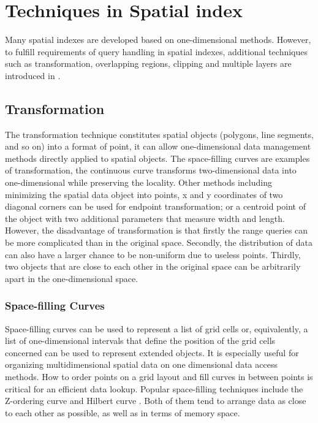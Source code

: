 \section{Techniques in Spatial index}
Many spatial indexes are developed based on one-dimensional methods. However, to fulfill requirements of query handling in spatial indexes, additional techniques such as transformation, overlapping regions, clipping and multiple layers are introduced in \cite{Faloutsos:1991ue}. 


\subsection{Transformation} \label{Transformation}
The transformation technique constitutes spatial objects (polygons, line segments, and so on) into a format of point, it can allow one-dimensional data management methods directly applied to spatial objects. The space-filling curves are examples of transformation, the continuous curve transforms two-dimensional data into one-dimensional while preserving the locality. Other methods including minimizing the spatial data object into points, x and y coordinates of two diagonal corners can be used for endpoint transformation; or a centroid point of the object with two additional parameters that measure width and length. However, the disadvantage of transformation is that firstly the range queries can be more complicated than in the original space. Secondly, the distribution of data can also have a larger chance to be non-uniform due to useless points. Thirdly, two objects that are close to each other in the original space can be arbitrarily apart in the one-dimensional space.  

\subsubsection{Space-filling Curves}
Space-filling curves can be used to represent a list of grid cells or, equivalently, a list of one-dimensional intervals that define the position of the grid cells concerned can be used to represent extended objects. It is especially useful for organizing multidimensional spatial data on one dimensional data access methods. How to order points on a grid layout and fill curves in between points is critical for an efficient data lookup. Popular space-filling techniques include the Z-ordering curve \cite{Orenstein:1984jq} and Hilbert curve \cite{Kamel:1994ux}. Both of them tend to arrange data as close to each other as possible, as well as in terms of memory space.

